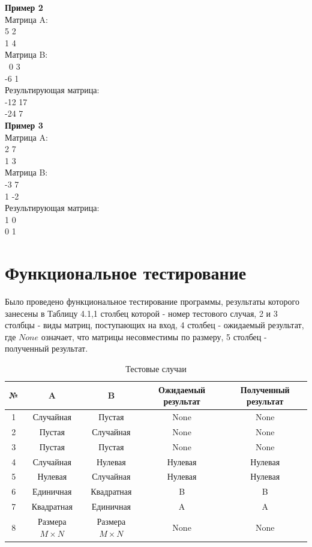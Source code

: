 \documentclass[a4paper,12pt]{report}
\begin{document}
\textbf {Пример 2}\\
Матрица A:\\
5 2\\
1 4\\
Матрица B:\\\
0 3\\
-6 1\\
Результирующая матрица:\\
-12 17\\
-24 7\\

\newpage 
\textbf {Пример 3}\\
Матрица A:\\
2 7\\
1 3\\
Матрица B:\\
-3 7\\
1 -2\\
Результирующая матрица:\\
1 0\\
0 1\\

\section{Функциональное тестирование}
\hspace{0.6cm}Было проведено функциональное тестирование программы, результаты которого занесены в Таблицу 4.1,1 столбец которой - номер тестового случая, 2 и 3 столбцы - виды матриц, поступающих на вход, 4 столбец - ожидаемый результат, где $None$ означает, что матрицы несовместимы по размеру, 5 столбец - полученный результат. \\

\begin{table}[h!]
\begin{center}
\begin{tabular}{| c | c | c | c | c |}
\hline
№ & A & B & Ожидаемый результат & Полученный результат \\
\hline
1 & Случайная & Пустая & None & None\\
\hline
2 & Пустая & Случайная & None & None\\
\hline
3 & Пустая & Пустая & None & None\\
\hline
4 & Случайная & Нулевая & Нулевая & Нулевая\\
\hline
5 & Нулевая & Случайная & Нулевая  & Нулевая \\
\hline
6 & Единичная & Квадратная & B & B\\
\hline
7 & Квадратная & Единичная & A & A\\
\hline
8 & Размера $M \times N$ & Размера $M \times N$ & None & None\\
\hline
\end{tabular}
\caption{Тестовые случаи}
\end{center}
\end{table}
\end{document}
